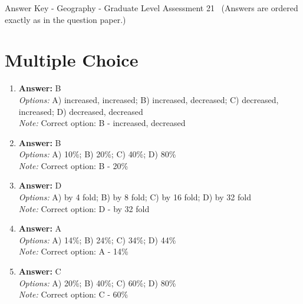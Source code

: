 \documentclass[12pt]{article}
\begin{document}
\begin{center}
Answer Key - Geography - Graduate Level Assessment 21 \
\small (Answers are ordered exactly as in the question paper.)
\end{center}

\section*{Multiple Choice}
\begin{enumerate}[label=\arabic*.]
\item \textbf{Answer:} B
\\ \textit{Options:} A) increased, increased; B) increased, decreased; C) decreased, increased; D) decreased, decreased
\\ \textit{Note:} Correct option: B - increased, decreased
\item \textbf{Answer:} B
\\ \textit{Options:} A) 10\%; B) 20\%; C) 40\%; D) 80\%
\\ \textit{Note:} Correct option: B - 20\%
\item \textbf{Answer:} D
\\ \textit{Options:} A) by 4 fold; B) by 8 fold; C) by 16 fold; D) by 32 fold
\\ \textit{Note:} Correct option: D - by 32 fold
\item \textbf{Answer:} A
\\ \textit{Options:} A) 14\%; B) 24\%; C) 34\%; D) 44\%
\\ \textit{Note:} Correct option: A - 14\%
\item \textbf{Answer:} C
\\ \textit{Options:} A) 20\%; B) 40\%; C) 60\%; D) 80\%
\\ \textit{Note:} Correct option: C - 60\%
\end{enumerate}
\end{document}
